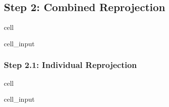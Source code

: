 \documentclass[letterpaper,10pt,english]{jupyterBook}
\begin{document}
\subsection{Step 2: Combined Reprojection}
\label{\detokenize{algorithm/CIMR_L2_TSA_SCEPS:step-2-combined-reprojection}}
\begin{sphinxuseclass}{cell}\begin{sphinxVerbatimInput}

\begin{sphinxuseclass}{cell_input}
\begin{sphinxVerbatim}[commandchars=\\\{\}]
  

  
   
\end{sphinxVerbatim}

\end{sphinxuseclass}\end{sphinxVerbatimInput}

\end{sphinxuseclass}

\subsubsection{Step 2.1: Individual Reprojection}
\label{\detokenize{algorithm/CIMR_L2_TSA_SCEPS:step-2-1-individual-reprojection}}
\begin{sphinxuseclass}{cell}\begin{sphinxVerbatimInput}

\begin{sphinxuseclass}{cell_input}
\begin{sphinxVerbatim}[commandchars=\\\{\}]
  
  
\end{sphinxVerbatim}

\end{sphinxuseclass}\end{sphinxVerbatimInput}

\end{sphinxuseclass}
\end{document}

